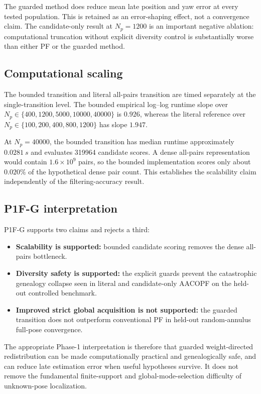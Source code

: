 The guarded method does reduce mean late position and yaw error at every tested population. This is retained as an error-shaping effect, not a convergence claim. The candidate-only result at \(N_p=1200\) is an important negative ablation: computational truncation without explicit diversity control is substantially worse than either PF or the guarded method.

\subsection{Computational scaling}
The bounded transition and literal all-pairs transition are timed separately at the single-transition level. The bounded empirical log--log runtime slope over \(N_p\in\{400,1200,5000,10000,40000\}\) is \(0.926\), whereas the literal reference over \(N_p\in\{100,200,400,800,1200\}\) has slope \(1.947\).

At \(N_p=40000\), the bounded transition has median runtime approximately \(\SI{0.0281}{s}\) and evaluates 319964 candidate scores. A dense all-pairs representation would contain \(1.6\times10^9\) pairs, so the bounded implementation scores only about \(0.020\%\) of the hypothetical dense pair count. This establishes the scalability claim independently of the filtering-accuracy result.

\subsection{P1F-G interpretation}
P1F-G supports two claims and rejects a third:
\begin{itemize}
    \item \textbf{Scalability is supported:} bounded candidate scoring removes the dense all-pairs bottleneck.
    \item \textbf{Diversity safety is supported:} the explicit guards prevent the catastrophic genealogy collapse seen in literal and candidate-only AACOPF on the held-out controlled benchmark.
    \item \textbf{Improved strict global acquisition is not supported:} the guarded transition does not outperform conventional PF in held-out random-annulus full-pose convergence.
\end{itemize}

The appropriate Phase-1 interpretation is therefore that guarded weight-directed redistribution can be made computationally practical and genealogically safe, and can reduce late estimation error when useful hypotheses survive. It does not remove the fundamental finite-support and global-mode-selection difficulty of unknown-pose localization.

